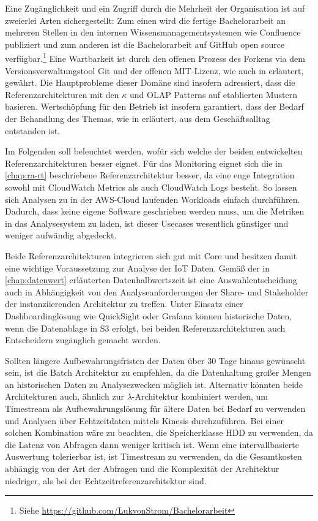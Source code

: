 Eine Zugänglichkeit und ein Zugriff durch die Mehrheit der Organisation ist auf zweierlei Arten sichergestellt: Zum einen wird die fertige Bachelorarbeit an mehreren Stellen in den internen Wissensmanagementsystemen wie Confluence publiziert und zum anderen ist die Bachelorarbeit auf GitHub open source verfügbar.\footnote{Siehe \url{https://github.com/LukvonStrom/Bachelorarbeit}} Eine Wartbarkeit ist durch den offenen Prozess des Forkens via dem Versionsverwaltungstool Git und der offenen MIT-Lizenz, wie auch in  erläutert, gewährt. Die Hauptprobleme dieser Domäne sind insofern adressiert, dass die Referenzarchitekturen mit den $\kappa$ und \ac{OLAP} Patterns auf etablierten Mustern basieren. Wertschöpfung für den Betrieb ist insofern garantiert, dass der Bedarf der Behandlung des Themas, wie in  erläutert, aus dem Geschäftsalltag entstanden ist.


Im Folgenden soll beleuchtet werden, wofür sich welche der beiden entwickelten Referenzarchitekturen besser eignet.
Für das Monitoring eignet sich die in \autoref{chap:ra-rt} beschriebene Referenzarchitektur besser, da eine enge Integration sowohl mit CloudWatch Metrics als auch CloudWatch Logs besteht. So lassen sich Analysen zu in der \ac{AWS}-Cloud laufenden Workloads einfach durchführen. Dadurch, dass keine eigene Software geschrieben werden muss, um die Metriken in das Analysesystem zu laden, ist dieser Usecases wesentlich günstiger und weniger aufwändig abgedeckt.

Beide Referenzarchitekturen integrieren sich gut mit \AWSIOT{} Core und besitzen damit eine wichtige Voraussetzung zur Analyse der \ac{IoT} Daten. Gemäß der in \autoref{chap:datenwert} erläuterten Datenhalbwertszeit ist eine Auswahlentscheidung auch in Abhängigkeit von den Analyseanforderungen der Share- und Stakeholder der instanziierenden Architektur zu treffen. Unter Einsatz einer Dashboardinglösung wie QuickSight oder Grafana können historische Daten, wenn die Datenablage in \ac{S3} erfolgt, bei beiden Referenzarchitekturen auch Entscheidern zugänglich gemacht werden. 

Sollten längere Aufbewahrungsfristen der Daten über 30 Tage hinaus gewünscht sein, ist die Batch Architektur zu empfehlen, da die Datenhaltung großer Mengen an historischen Daten zu Analysezwecken möglich ist. Alternativ könnten beide Architekturen auch, ähnlich zur $\lambda$-Architektur kombiniert werden, um Timestream als Aufbewahrungslösung für ältere Daten bei Bedarf zu verwenden und Analysen über Echtzeitdaten mittels Kinesis durchzuführen. Bei einer solchen Kombination wäre zu beachten, die Speicherklasse \ac{HDD} zu verwenden, da die Latenz von Abfragen dann weniger kritisch ist. Wenn eine intervallbasierte Auswertung tolerierbar ist, ist Timestream zu verwenden, da die Gesamtkosten abhängig von der Art der Abfragen und die Komplexität der Architektur niedriger, als bei der Echtzeitreferenzarchitektur sind.


